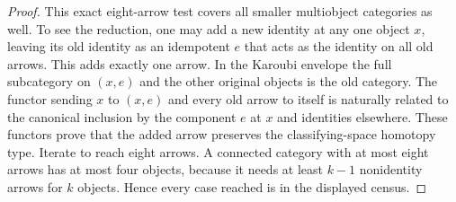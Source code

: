 \begin{proof}
This exact eight-arrow test covers all smaller multiobject categories
as well. To see the reduction, one may add a new identity at any
one object $x$, leaving its old identity as an idempotent $e$ that
acts as the identity on all old arrows. This adds exactly one arrow.
In the Karoubi envelope the full subcategory on $(x,e)$ and the other
original objects is the old category. The functor sending $x$ to
$(x,e)$ and every old arrow to itself is naturally related to the
canonical inclusion by the component $e$ at $x$ and identities
elsewhere. These functors prove that the added arrow preserves
the classifying-space homotopy type. Iterate to reach eight arrows.
A connected category with at most eight arrows has at most four
objects, because it needs at least $k-1$ nonidentity arrows for
$k$ objects. Hence every case reached is in the displayed census.
\end{proof}

